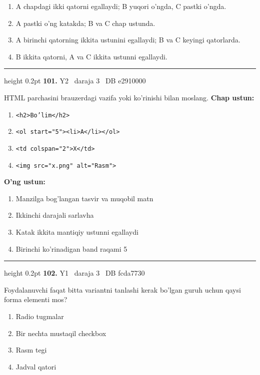 \documentclass[10pt,a4paper,oneside]{article}
\begin{document}
\begin{enumerate}[label=\Alph*),leftmargin=9mm]
\item A chapdagi ikki qatorni egallaydi; B yuqori o'ngda, C pastki o'ngda.
\item A pastki o'ng katakda; B va C chap ustunda.
\item A birinchi qatorning ikkita ustunini egallaydi; B va C keyingi qatorlarda.
\item B ikkita qatorni, A va C ikkita ustunni egallaydi.
\end{enumerate}
\vspace{2mm}\hrule height 0.2pt \vspace{4mm}
\hypertarget{q101}{\textbf{\color{ink}101.}}  {\color{muted}\scriptsize Y2 \textbullet\ daraja 3 \textbullet\ DB e2910000}
\par
HTML parchasini brauzerdagi vazifa yoki ko'rinishi bilan moslang.
\textbf{\footnotesize Chap ustun:}
\begin{enumerate}[label=\arabic*),leftmargin=9mm]
\item \texttt{\textless{}h2\textgreater{}Bo'lim\textless{}/h2\textgreater{}}
\item \texttt{\textless{}ol start="5"\textgreater{}\textless{}li\textgreater{}A\textless{}/li\textgreater{}\textless{}/ol\textgreater{}}
\item \texttt{\textless{}td colspan="2"\textgreater{}X\textless{}/td\textgreater{}}
\item \texttt{\textless{}img src="x.png" alt="Rasm"\textgreater{}}
\end{enumerate}
\textbf{\footnotesize O'ng ustun:}
\begin{enumerate}[label=\Alph*),leftmargin=9mm]
\item Manzilga bog'langan tasvir va muqobil matn
\item Ikkinchi darajali sarlavha
\item Katak ikkita mantiqiy ustunni egallaydi
\item Birinchi ko'rinadigan band raqami 5
\end{enumerate}
\vspace{2mm}\hrule height 0.2pt \vspace{4mm}
\hypertarget{q102}{\textbf{\color{ink}102.}}  {\color{muted}\scriptsize Y1 \textbullet\ daraja 3 \textbullet\ DB fcda7730}
\par
Foydalanuvchi faqat bitta variantni tanlashi kerak bo'lgan guruh uchun qaysi forma elementi mos?
\begin{enumerate}[label=\Alph*),leftmargin=9mm]
\item Radio tugmalar
\item Bir nechta mustaqil checkbox
\item Rasm tegi
\item Jadval qatori
\end{enumerate}
\end{document}
